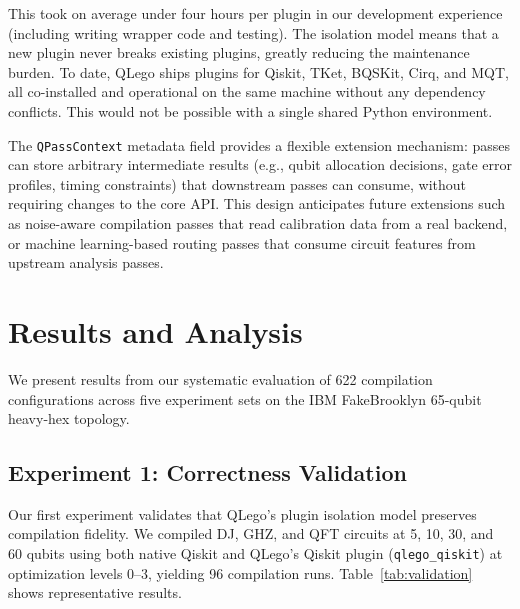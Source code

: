 \documentclass[conference]{IEEEtran}
\begin{document}
This took on average under four hours per plugin in our development experience (including writing wrapper code and testing). The isolation model means that a new plugin never breaks existing plugins, greatly reducing the maintenance burden. To date, QLego ships plugins for Qiskit, TKet, BQSKit, Cirq, and MQT, all co-installed and operational on the same machine without any dependency conflicts. This would not be possible with a single shared Python environment.

The \texttt{QPassContext} metadata field provides a flexible extension mechanism: passes can store arbitrary intermediate results (e.g., qubit allocation decisions, gate error profiles, timing constraints) that downstream passes can consume, without requiring changes to the core API. This design anticipates future extensions such as noise-aware compilation passes that read calibration data from a real backend, or machine learning-based routing passes that consume circuit features from upstream analysis passes.

\section{Results and Analysis}
\label{sec:results}

We present results from our systematic evaluation of 622 compilation configurations across five experiment sets on the IBM FakeBrooklyn 65-qubit heavy-hex topology.

\subsection{Experiment 1: Correctness Validation}

Our first experiment validates that QLego's plugin isolation model preserves compilation fidelity. We compiled DJ, GHZ, and QFT circuits at 5, 10, 30, and 60 qubits using both native Qiskit and QLego's Qiskit plugin (\texttt{qlego\_qiskit}) at optimization levels 0--3, yielding 96 compilation runs. Table~\ref{tab:validation} shows representative results.
\end{document}
